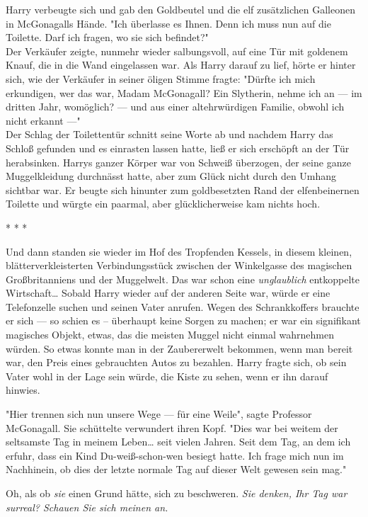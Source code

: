{Harry verbeugte sich und gab den Goldbeutel und die elf zusätzlichen Galleonen in McGonagalls Hände. "Ich überlasse es Ihnen. Denn ich muss nun auf die Toilette. Darf ich fragen, wo sie sich befindet?"\\ Der Verkäufer zeigte, nunmehr wieder salbungsvoll, auf eine Tür mit goldenem Knauf, die in die Wand eingelassen war. Als Harry darauf zu lief, hörte er hinter sich, wie der Verkäufer in seiner öligen Stimme fragte: "Dürfte ich mich erkundigen, wer das war, Madam McGonagall? Ein Slytherin, nehme ich an --- im dritten Jahr, womöglich? --- und aus einer altehrwürdigen Familie, obwohl ich nicht erkannt ---"\\ Der Schlag der Toilettentür schnitt seine Worte ab und nachdem Harry das Schloß gefunden und es einrasten lassen hatte, ließ er sich erschöpft an der Tür herabsinken. Harrys ganzer Körper war von Schweiß überzogen, der seine ganze Muggelkleidung durchnässt hatte, aber zum Glück nicht durch den Umhang sichtbar war. Er beugte sich hinunter zum goldbesetzten Rand der elfenbeinernen Toilette und würgte ein paarmal, aber glücklicherweise kam nichts hoch.

* * *

Und dann standen sie wieder im Hof des Tropfenden Kessels, in diesem kleinen, blätterverkleisterten Verbindungsstück zwischen der Winkelgasse des magischen Großbritanniens und der Muggelwelt. Das war schon eine \emph{unglaublich} entkoppelte Wirtschaft… Sobald Harry wieder auf der anderen Seite war, würde er eine Telefonzelle suchen und seinen Vater anrufen. Wegen des Schrankkoffers brauchte er sich --- so schien es -- überhaupt keine Sorgen zu machen; er war ein signifikant magisches Objekt, etwas, das die meisten Muggel nicht einmal wahrnehmen würden. So etwas konnte man in der Zaubererwelt bekommen, wenn man bereit war, den Preis eines gebrauchten Autos zu bezahlen. Harry fragte sich, ob sein Vater wohl in der Lage sein würde, die Kiste zu sehen, wenn er ihn darauf hinwies.

"Hier trennen sich nun unsere Wege --- für eine Weile", sagte Professor McGonagall. Sie schüttelte verwundert ihren Kopf. "Dies war bei weitem der seltsamste Tag in meinem Leben… seit vielen Jahren. Seit dem Tag, an dem ich erfuhr, dass ein Kind Du-weiß-schon-wen besiegt hatte. Ich frage mich nun im Nachhinein, ob dies der letzte normale Tag auf dieser Welt gewesen sein mag."

Oh, als ob \emph{sie} einen Grund hätte, sich zu beschweren. \emph{Sie denken, Ihr Tag war surreal? Schauen Sie sich meinen an.}

}
